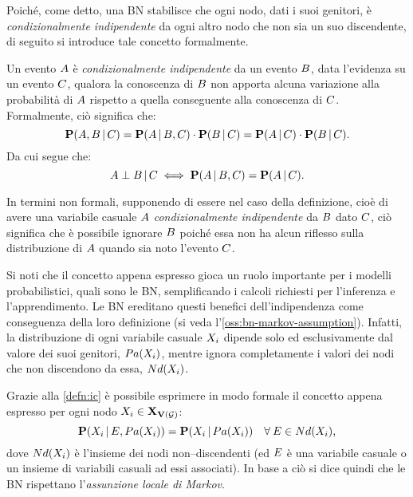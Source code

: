 Poiché, come detto, una \acl{BN} stabilisce che ogni nodo, dati i suoi genitori, è \emph{condizionalmente indipendente} da ogni altro nodo che non sia un suo discendente, di seguito si introduce tale concetto formalmente.
\begin{definizione}\label{defn:ic}
Un evento $\mathnormal{A}$ è \emph{condizionalmente indipendente} da un evento $\mathnormal{B}$, data l'evidenza su un evento $\mathnormal{C}$, qualora la conoscenza di $\mathnormal{B}$ non apporta alcuna variazione alla probabilità di $\mathnormal{A}$ rispetto a quella conseguente alla conoscenza di $\mathnormal{C}$.
Formalmente, ciò significa che:
\[
\mathbf{P}(\mathnormal{A},\mathnormal{B}\,\arrowvert\,\mathnormal{C})=\mathbf{P}(\mathnormal{A}\,\arrowvert\,\mathnormal{B},\mathnormal{C})\cdot\mathbf{P}(\mathnormal{B}\,\arrowvert\,\mathnormal{C})=\mathbf{P}(\mathnormal{A}\,\arrowvert\,\mathnormal{C})\cdot\mathbf{P}(\mathnormal{B}\,\arrowvert\,\mathnormal{C})\text{.}
\]
Da cui segue che:
\[
\mathnormal{A}\perp\mathnormal{B}\,\arrowvert\,\mathnormal{C}\iff\mathbf{P}(\mathnormal{A}\,\arrowvert\,\mathnormal{B},\mathnormal{C})=\mathbf{P}(\mathnormal{A}\,\arrowvert\,\mathnormal{C})\text{.}
\]
\end{definizione}
In termini non formali, supponendo di essere nel caso della definizione, cioè di avere una variabile casuale $\mathnormal{A}$ \emph{condizionalmente indipendente} da $\mathnormal{B}$ dato $\mathnormal{C}$, ciò significa che è possibile ignorare $\mathnormal{B}$ poiché essa non ha alcun riflesso sulla distribuzione \cond*{} di $\mathnormal{A}$ quando sia noto l'evento $\mathnormal{C}$.

Si noti che il concetto appena espresso gioca un ruolo importante per i modelli probabilistici, quali sono le \acl{BN}, semplificando i calcoli richiesti per l'inferenza e l'apprendimento. Le \acl{BN} ereditano questi benefici dell'indipendenza \cond*{} come conseguenza della loro definizione (si veda l'\autoref{oss:bn-markov-assumption}). Infatti, la distribuzione \cond*{} di ogni variabile casuale $\mathnormal{X_i}$ dipende solo ed esclusivamente dal valore dei suoi genitori, $Pa(\mathnormal{X_i})$, mentre ignora completamente i valori dei nodi che non discendono da essa, $Nd(\mathnormal{X_i})$.

Grazie alla \autoref{defn:ic} è possibile esprimere in modo formale il concetto appena espresso per ogni nodo $\mathnormal{X_i}\in\mathbf{X}_{\mathbf{V}(\mathcal{G})}$:
\[
\mathbf{P}(\mathnormal{X_i}\,\arrowvert\,\mathnormal{E},Pa(\mathnormal{X_i}))=\mathbf{P}(\mathnormal{X_i}\,\arrowvert\,Pa(\mathnormal{X_i})) \quad \forall\:\mathnormal{E}\in Nd(\mathnormal{X_i})\text{,}
\]
dove $Nd(\mathnormal{X_i})$ è l'insieme dei nodi non--discendenti (ed $\mathnormal{E}$ è una variabile casuale o un insieme di variabili casuali ad essi associati).
In base a ciò si dice quindi che le \acl{BN} rispettano l'\emph{assunzione locale di Markov}.

